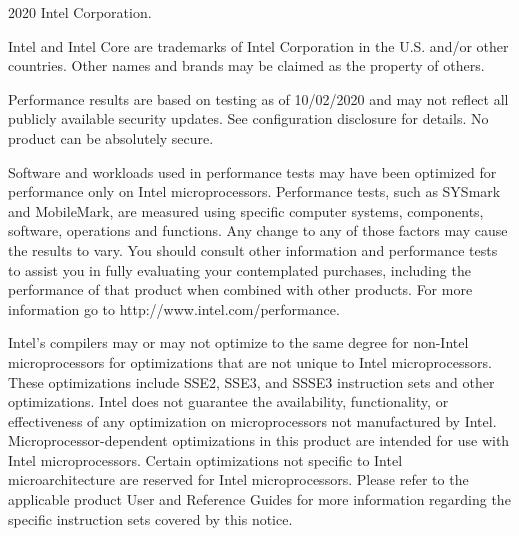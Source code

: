 \scriptsize
\begin{framed}

2020 Intel Corporation.

Intel and Intel Core are trademarks of Intel Corporation in
the U.S. and/or other countries. Other names and brands may be claimed as the property of others.

Performance results are based on testing as of 10/02/2020 and may not reflect
all publicly available security updates.
See configuration disclosure for details.
No product can be absolutely secure.

Software and workloads used in performance tests may have been optimized for
performance only on Intel microprocessors. Performance tests, such as SYSmark
and MobileMark, are measured using specific computer systems, components,
software, operations and functions.
Any change to any of those factors may cause the results to vary.
You should consult other information and performance tests
to assist you in fully evaluating your contemplated purchases, including the
performance of that product when combined with other products.
For more information go to http://www.intel.com/performance.

Intel's compilers may or may not optimize to the same degree for non-Intel
microprocessors for optimizations that are not unique to Intel microprocessors.
These optimizations include SSE2, SSE3, and SSSE3 instruction
sets and other optimizations. Intel does not guarantee the availability,
functionality, or effectiveness of any optimization on microprocessors not
manufactured by Intel. Microprocessor-dependent optimizations in this product
are intended for use with Intel microprocessors. Certain optimizations not
specific to Intel microarchitecture are reserved for Intel microprocessors.
Please refer to the applicable product User and Reference Guides for more
information regarding the specific instruction sets covered by this notice.
\end{framed}
